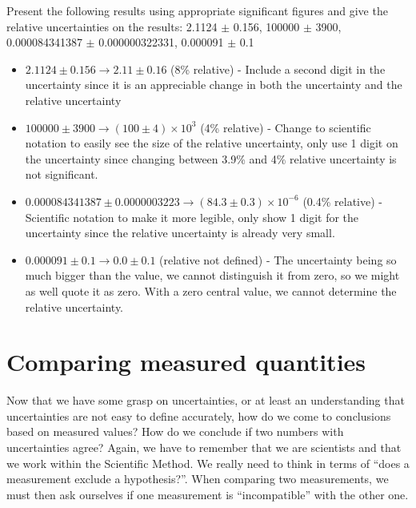 \begin{example}{Present the following results using appropriate significant figures and give the relative uncertainties on the results: 2.1124 $\pm$ 0.156, 100000 $\pm$ 3900,\\ 0.000084341387 $\pm$ 0.000000322331, 0.000091 $\pm$ 0.1}
\begin{itemize}[topsep=0pt]
 \item $2.1124 \pm 0.156 \rightarrow 2.11 \pm 0.16$ (8\% relative) - Include a second digit in the uncertainty since it is an appreciable change in both the uncertainty and the relative uncertainty
 \item $100000 \pm 3900 \rightarrow (100 \pm 4)\times 10^3$ (4\% relative) - Change to scientific notation to easily see the size of the relative uncertainty, only use 1 digit on the uncertainty since changing between 3.9\% and 4\% relative uncertainty is not significant.
 \item $0.000084341387 \pm 0.0000003223 \rightarrow (84.3 \pm 0.3)\times 10^{-6}$ (0.4\% relative) - Scientific notation to make it more legible, only show 1 digit for the uncertainty since the relative uncertainty is already very small.
 \item $0.000091 \pm 0.1 \rightarrow 0.0 \pm 0.1$ (relative not defined) - The uncertainty being so much bigger than the value, we cannot distinguish it from zero, so we might as well quote it as zero. With a zero central value, we cannot determine the relative uncertainty. 
\end{itemize}
\end{example}

\section{Comparing measured quantities}
Now that we have some grasp on uncertainties, or at least an understanding that uncertainties are not easy to define accurately, how do we come to conclusions based on measured values? How do we conclude if two numbers with uncertainties agree? Again, we have to remember that we are scientists and that we work within the Scientific Method. We really need to think in terms of ``does a measurement exclude a hypothesis?''. When comparing two measurements, we must then ask ourselves if one measurement is ``incompatible'' with the other one.

